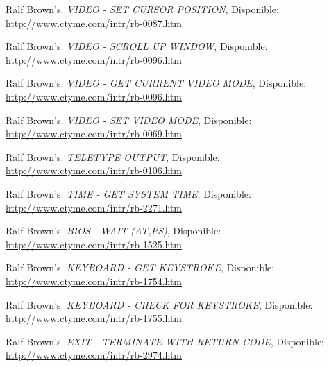 \documentclass[journal]{../../IEEEtran/IEEEtran}
\begin{document}
%
%
%
\begin{thebibliography}{15}

  Ralf Brown's. \emph{VIDEO - SET CURSOR POSITION},
  Disponible:
  \url{http://www.ctyme.com/intr/rb-0087.htm}

  Ralf Brown's. \emph{VIDEO - SCROLL UP WINDOW},
  Disponible:
  \url{http://www.ctyme.com/intr/rb-0096.htm}
    
  
  Ralf Brown's. \emph{VIDEO - GET CURRENT VIDEO MODE},
  Disponible:
  \url{http://www.ctyme.com/intr/rb-0096.htm}

  Ralf Brown's. \emph{VIDEO - SET VIDEO MODE},
  Disponible:
  \url{http://www.ctyme.com/intr/rb-0069.htm}

  Ralf Brown's. \emph{TELETYPE OUTPUT},
  Disponible:
  \url{http://www.ctyme.com/intr/rb-0106.htm}  

  Ralf Brown's. \emph{TIME - GET SYSTEM TIME},
  Disponible:
  \url{http://www.ctyme.com/intr/rb-2271.htm}


  Ralf Brown's. \emph{BIOS - WAIT (AT,PS)},
  Disponible:
  \url{http://www.ctyme.com/intr/rb-1525.htm}  
  

  Ralf Brown's. \emph{KEYBOARD - GET KEYSTROKE},
  Disponible:
  \url{http://www.ctyme.com/intr/rb-1754.htm}
  
  Ralf Brown's. \emph{KEYBOARD - CHECK FOR KEYSTROKE},
  Disponible:
  \url{http://www.ctyme.com/intr/rb-1755.htm}  
  
  Ralf Brown's. \emph{EXIT - TERMINATE WITH RETURN CODE},
  Disponible:
  \url{http://www.ctyme.com/intr/rb-2974.htm}


\end{thebibliography}
\end{document}
